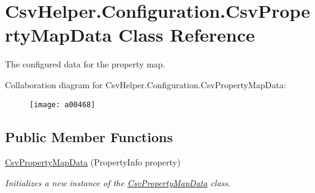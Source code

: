 \hypertarget{a00070}{\section{Csv\-Helper.\-Configuration.\-Csv\-Property\-Map\-Data Class Reference}
\label{a00070}
}


The configured data for the property map.  




Collaboration diagram for Csv\-Helper.\-Configuration.\-Csv\-Property\-Map\-Data\-:
\nopagebreak
\begin{figure}[H]
\begin{center}
\leavevmode
\texttt{[image: a00468]}
\end{center}
\end{figure}
\subsection*{Public Member Functions}
\begin{DoxyCompactItemize}
\item 
\hyperlink{a00070_a1a1424683bea80f373e3ea80ae6e39c7}{Csv\-Property\-Map\-Data} (Property\-Info property)
\begin{DoxyCompactList}\small\item\em Initializes a new instance of the \hyperlink{a00070}{Csv\-Property\-Map\-Data} class. \end{DoxyCompactList}\end{DoxyCompactItemize}

